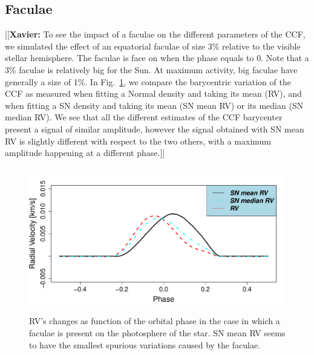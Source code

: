 \documentclass[11pt, oneside]{article}
\newcommand{\xavier}[1]{{\color{blue}[[\textbf{Xavier: }#1]]}}
\begin{document}
\subsection{Faculae} \label{sec:soap.faculae}

\xavier{To see the impact of a faculae on the different parameters of the CCF, we simulated the effect of an equatorial faculae of size 3\% relative to the visible stellar hemisphere. The faculae is face on when the phase equals to 0. Note that a 3\% faculae is relatively big for the Sun. At maximum activity, big faculae have generally a size of 1\%.
In Fig.~\ref{fig:faculae}, we compare the barycentric variation of the CCF as measured when fitting a Normal density and taking its mean (RV), and when fitting a SN density and taking its mean (SN mean RV) or its median (SN median RV). We see that all the different estimates of the CCF barycenter present a signal of similar amplitude, however the signal obtained with SN mean RV is slightly different with respect to the two others, with a maximum amplitude happening at a different phase.}

\begin{figure}[htbp]
   \centering
\includegraphics[height = 2.5in]{RV_comparison_FACULAE.pdf} 
\caption{RV's changes as function of the orbital phase in the case in which a faculae is present on the photosphere of the star. SN mean RV seems to have the smallest spurious variations caused by the faculae.}
    \label{fig:faculae}
\end{figure}
\end{document}

